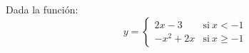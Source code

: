 \documentclass[addpoints,spanish, 12pt,a4paper]{exam}
\begin{document}
\begin{questions}

\question Dada la función: $$y=\begin{cases} 2 x - 3 & \text{si}\: x < -1 \\- x^{2} + 2 x & \text{si}\: x\geq -1 \end{cases}$$
\begin{parts}

\end{parts}
\end{questions}
\end{document}
